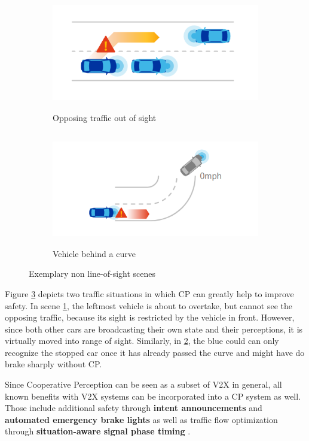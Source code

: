 \begin{figure}[h]
	
	\begin{subfigure}{0.5\textwidth}
		\includegraphics[width=1.0\linewidth, height=5cm]{98_images/nloss_2.png} 
		\caption{Opposing traffic out of sight}
		\label{fig:cp_use_cases_1}
	\end{subfigure}
	\begin{subfigure}{0.5\textwidth}
		\includegraphics[width=1.2\linewidth, height=5cm]{98_images/nloss_3.png}
		\caption{Vehicle behind a curve}
		\label{fig:cp_use_cases_2}
	\end{subfigure}
	
	\caption{Exemplary non line-of-sight scenes \cite{QualcommTechnologiesInc.2017}}
	\label{fig:cp_use_cases}
\end{figure}

Figure \ref{fig:cp_use_cases} depicts two traffic situations in which CP can greatly help to improve safety. In scene \ref{fig:cp_use_cases_1}, the leftmost vehicle is about to overtake, but cannot see the opposing traffic, because its sight is restricted by the vehicle in front. However, since both other cars are broadcasting their own state and their perceptions, it is virtually moved into range of sight. Similarly, in \ref{fig:cp_use_cases_2}, the blue could can only recognize the stopped car once it has already passed the curve and might have do brake sharply without CP.

Since Cooperative Perception can be seen as a subset of V2X in general, all known benefits with V2X systems can be incorporated into a CP system as well. Those include additional safety through \textbf{intent announcements} and \textbf{automated emergency brake lights} as well as traffic flow optimization through \textbf{situation-aware signal phase timing} \cite{5GAutomotiveAssociation2019b}.

